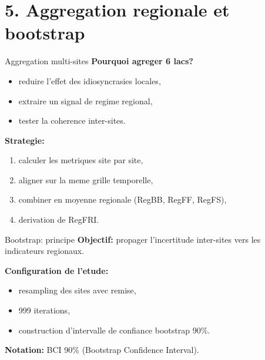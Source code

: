 \documentclass[aspectratio=169,11pt]{beamer}
\begin{document}
\section{5. Aggregation regionale et bootstrap}

\begin{frame}{Aggregation multi-sites}
\textbf{Pourquoi agreger 6 lacs?}
\begin{itemize}
  \item reduire l'effet des idiosyncrasies locales,
  \item extraire un signal de regime regional,
  \item tester la coherence inter-sites.
\end{itemize}

\textbf{Strategie:}
\begin{enumerate}
  \item calculer les metriques site par site,
  \item aligner sur la meme grille temporelle,
  \item combiner en moyenne regionale (RegBB, RegFF, RegFS),
  \item derivation de RegFRI.
\end{enumerate}
\end{frame}

\begin{frame}{Bootstrap: principe}
\textbf{Objectif:} propager l'incertitude inter-sites vers les indicateurs regionaux.

\textbf{Configuration de l'etude:}
\begin{itemize}
  \item resampling des sites avec remise,
  \item \alert{999 iterations},
  \item construction d'intervalle de confiance bootstrap \alert{90\%}.
\end{itemize}

\textbf{Notation:} BCI 90\% (Bootstrap Confidence Interval).
\end{frame}
\end{document}

